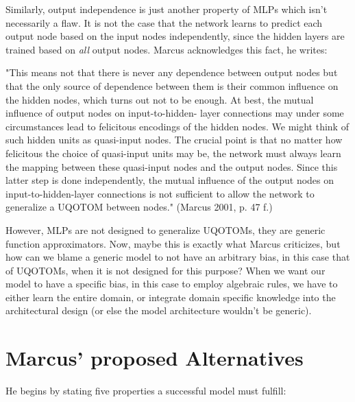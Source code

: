 \documentclass[../../main.tex]{subfiles}
\begin{document}
\begin{critique}
    Similarly, output independence is just another property of MLPs which isn't necessarily a flaw. It is not the case that the network learns to predict each output node based on the input nodes independently, since the hidden layers are trained based on \emph{all} output nodes.
    Marcus acknowledges this fact, he writes:

    "This means not that there is never any dependence between output
    nodes but that the only source of dependence between them is their common influence on the hidden nodes, which turns out not to be enough.
    At best, the mutual influence of output nodes on input-to-hidden-
    layer connections may under some circumstances lead to felicitous
    encodings of the hidden nodes. We might think of such hidden units
    as quasi-input nodes. The crucial point is that no matter how felicitous
    the choice of quasi-input units may be, the network must always learn
    the mapping between these quasi-input nodes and the output nodes.
    Since this latter step is done independently, the mutual influence of the
    output nodes on input-to-hidden-layer connections is not sufficient
    to allow the network to generalize a UQOTOM between nodes." (Marcus 2001, p. 47 f.)

    However, MLPs are not designed to generalize UQOTOMs, they are generic function approximators. Now, maybe this is exactly what Marcus criticizes, but how can we blame a generic model to not have an arbitrary bias, in this case that of UQOTOMs, when it is not designed for this purpose? When we want our model to have a specific bias, in this case to employ algebraic rules, we have to either learn the entire domain, or integrate domain specific knowledge into the architectural design (or else the model architecture wouldn't be generic).
\end{critique}

\section{Marcus' proposed Alternatives}
He begins by stating five properties a successful model must fulfill:
\end{document}
